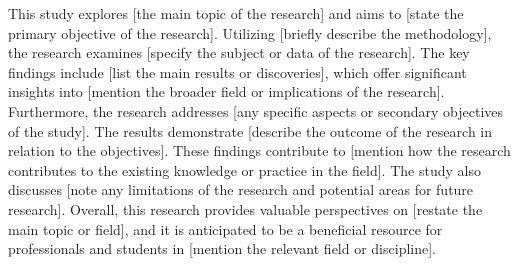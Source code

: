 This study explores [the main topic of the research] and aims to [state the primary objective of the research]. 
Utilizing [briefly describe the methodology], the research examines [specify the subject or data of the research]. 
The key findings include [list the main results or discoveries], which offer significant insights into [mention the broader field or implications of the research].
Furthermore, the research addresses [any specific aspects or secondary objectives of the study]. 
The results demonstrate [describe the outcome of the research in relation to the objectives]. 
These findings contribute to [mention how the research contributes to the existing knowledge or practice in the field].
The study also discusses [note any limitations of the research and potential areas for future research]. 
Overall, this research provides valuable perspectives on [restate the main topic or field], and it is anticipated to be a beneficial resource for professionals and students in [mention the relevant field or discipline].